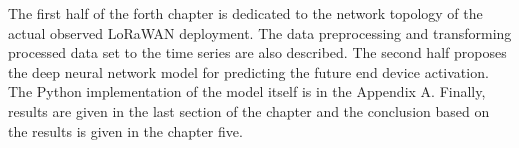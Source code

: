 The first half of the forth chapter is dedicated to the network topology of the actual observed LoRaWAN deployment. 
The data preprocessing and transforming processed data set to the time series are also described.
The second half proposes the deep neural network model for predicting the future end device activation. 
The Python implementation of the model itself is in the Appendix A.
Finally, results are given in the last section of the chapter and the conclusion based on the results is given in the chapter five.